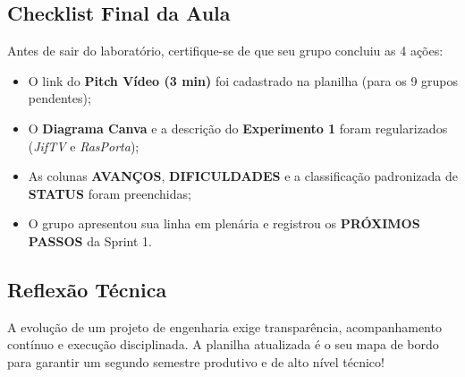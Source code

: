 
\subsection{Checklist Final da Aula}

\begin{boxAtividade}

Antes de sair do laboratório, certifique-se de que seu grupo concluiu as 4 ações:

\begin{itemize}
\item O link do \textbf{Pitch Vídeo (3 min)} foi cadastrado na planilha (para os 9 grupos pendentes);
\item O \textbf{Diagrama Canva} e a descrição do \textbf{Experimento 1} foram regularizados (\textit{JifTV} e \textit{RasPorta});
\item As colunas \textbf{AVANÇOS}, \textbf{DIFICULDADES} e a classificação padronizada de \textbf{STATUS} foram preenchidas;
\item O grupo apresentou sua linha em plenária e registrou os \textbf{PRÓXIMOS PASSOS} da Sprint 1.
\end{itemize}

\end{boxAtividade}


\subsection*{Reflexão Técnica}

A evolução de um projeto de engenharia exige transparência, acompanhamento contínuo e execução disciplinada. A planilha atualizada é o seu mapa de bordo para garantir um segundo semestre produtivo e de alto nível técnico!
